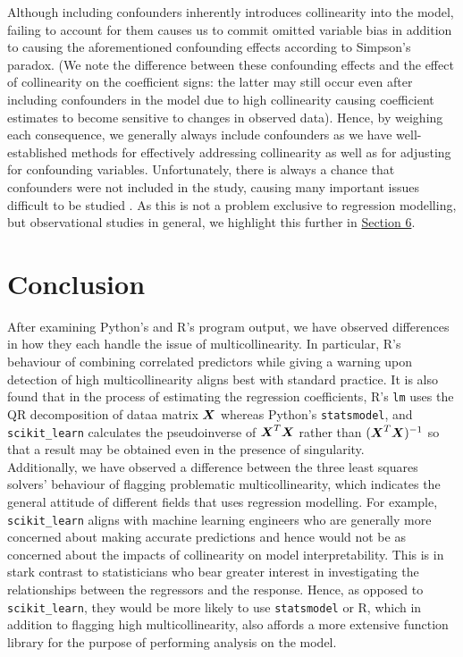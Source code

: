 \documentclass[12pt]{article}
\begin{document}
	Although including confounders inherently introduces collinearity into the model, failing to account for them causes us to commit omitted variable bias in addition to causing the aforementioned confounding effects according to Simpson's paradox. (We note the difference between these confounding effects and the effect of collinearity on the coefficient signs: the latter may still occur even after including confounders in the model due to high collinearity causing coefficient estimates to become sensitive to changes in observed data). Hence, by weighing each consequence, we generally always include confounders as we have well-established methods for effectively addressing collinearity as well as for adjusting for confounding variables. Unfortunately, there is always a chance that confounders were not included in the study, causing many important issues difficult to be studied \cite{Agresti2018}. As this is not a problem exclusive to regression modelling, but observational studies in general, we highlight this further in \hyperref[sec:future-rec]{Section 6}.
	
	\section{Conclusion}
	
	After examining Python's and R's program output, we have observed differences in how they each handle the issue of multicollinearity. In particular, R's behaviour of combining correlated predictors while giving a warning upon detection of high multicollinearity aligns best with standard practice. It is also found that in the process of estimating the regression coefficients, R's \texttt{lm} uses the QR decomposition of dataa matrix $\boldsymbol{X}$ whereas Python's \texttt{statsmodel}, and \texttt{scikit\_learn} calculates the pseudoinverse of $\boldsymbol{X}^T\boldsymbol{X}$ rather than $(\boldsymbol{X}^T\boldsymbol{X})^{-1}$ so that a result may be obtained even in the presence of singularity.\\
	
	Additionally, we have observed a difference between the three least squares solvers' behaviour of flagging problematic multicollinearity, which indicates the general attitude of different fields that uses regression modelling. For example, \texttt{scikit\_learn} aligns with machine learning engineers who are generally more concerned about making accurate predictions and hence would not be as concerned about the impacts of collinearity on model interpretability. This is in stark contrast to statisticians who bear greater interest in investigating the relationships between the regressors and the response. Hence, as opposed to \texttt{scikit\_learn}, they would be more likely to use \texttt{statsmodel} or R, which in addition to flagging high multicollinearity, also affords a more extensive function library for the purpose of performing analysis on the model.\\
	
\end{document}
